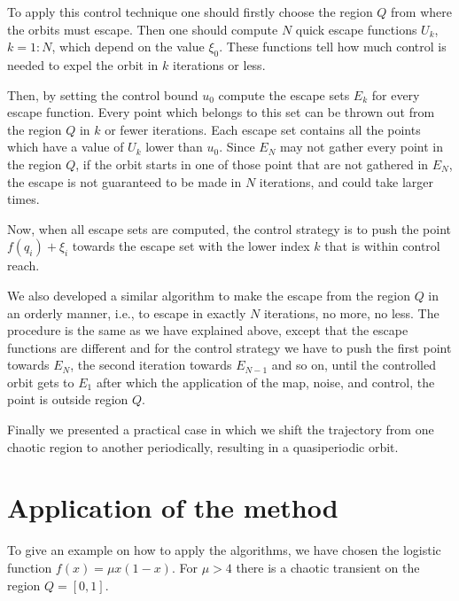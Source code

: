 To apply this control technique one should firstly choose the region $Q$ from where the orbits must escape. Then one should compute $N$ quick escape functions $U_k$, $k = 1:N$, which depend on the value $\xi_0$. These functions tell how much control is needed to expel the orbit in $k$ iterations or less.

Then, by setting the control bound $u_0$ compute the escape sets $E_k$ for every escape function. Every point which belongs to this set can be thrown out from the region $Q$ in $k$ or fewer iterations. Each escape set contains all the points which have a value of $U_k$ lower than $u_0$. Since $E_N$ may not gather every point in the region $Q$, if the orbit starts in one of those point that are not gathered in $E_N$, the escape is not guaranteed to be made in $N$ iterations, and could take larger times.

Now, when all escape sets are computed, the control strategy is to push the point $f(q_i) + \xi_i$ towards the escape set with the lower index $k$ that is within control reach.

We also developed a similar algorithm to make the escape from the region $Q$ in an orderly manner, i.e., to escape in exactly $N$ iterations, no more, no less. The procedure is the same as we have explained above, except that the escape functions are different and for the control strategy we have to push the first point towards $E_N$, the second iteration towards $E_{N-1}$ and so on, until the controlled orbit gets to $E_1$ after which the application of the map, noise, and control, the point is outside region $Q$.

Finally we presented a practical case in which we shift the trajectory from one chaotic region to another periodically, resulting in a quasiperiodic orbit.

\section{Application of the method}


To give an example on how to apply the algorithms, we have chosen the logistic function $f(x) = \mu x(1-x)$. For $\mu > 4$ there is a chaotic transient on the region $Q=[0,1]$. 


